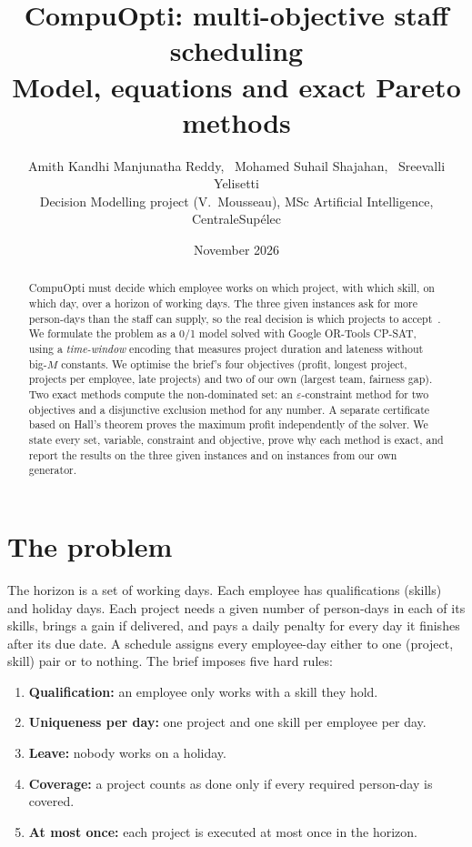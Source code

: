 \documentclass[10pt,a4paper]{article}
\title{\textbf{CompuOpti: multi-objective staff scheduling}\\[4pt]
\large Model, equations and exact Pareto methods}
\author{Amith Kandhi Manjunatha Reddy, \ Mohamed Suhail Shajahan, \ Sreevalli Yelisetti\\[4pt]
\small Decision Modelling project (V.~Mousseau), MSc Artificial Intelligence, CentraleSup\'elec}
\date{November 2026}
\theoremstyle{plain}
\theoremstyle{definition}
\theoremstyle{remark}
\begin{document}
\maketitle

\begin{abstract}
\noindent
CompuOpti must decide which employee works on which project, with which skill, on which day, over a
horizon of working days. The three given instances ask for more person-days than the staff can
supply, so the real decision is which projects to accept~\cite{brief}. We formulate the problem as a 0/1 model
solved with Google OR-Tools CP-SAT, using a \emph{time-window} encoding that measures project
duration and lateness without big-$M$ constants. We optimise the brief's four objectives (profit,
longest project, projects per employee, late projects) and two of our own (largest team, fairness
gap). Two exact methods compute the non-dominated set: an $\varepsilon$-constraint method for two
objectives and a disjunctive exclusion method for any number. A separate certificate based on Hall's
theorem proves the maximum profit independently of the solver. We state every set, variable,
constraint and objective, prove why each method is exact, and report the results on the three given
instances and on instances from our own generator.
\end{abstract}


\section{The problem}

The horizon is a set of working days. Each employee has qualifications (skills) and holiday days.
Each project needs a given number of person-days in each of its skills, brings a gain if delivered,
and pays a daily penalty for every day it finishes after its due date. A schedule assigns every
employee-day either to one (project, skill) pair or to nothing. The brief imposes five hard rules:

\begin{enumerate}[label=\textbf{R\arabic*}]
  \item \textbf{Qualification:} an employee only works with a skill they hold.
  \item \textbf{Uniqueness per day:} one project and one skill per employee per day.
  \item \textbf{Leave:} nobody works on a holiday.
  \item \textbf{Coverage:} a project counts as done only if every required person-day is covered.
  \item \textbf{At most once:} each project is executed at most once in the horizon.
\end{enumerate}
\end{document}

